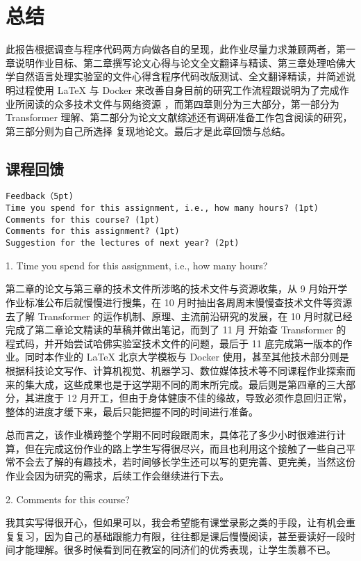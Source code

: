 \chapter{总结}

此报告根据调查与程序代码两方向做各自的呈现，此作业尽量力求兼顾两者，第一章说明作业目标、第二章撰写论文心得与论文全文翻译与精读、第三章处理哈佛大学自然语言处理实验室的文件心得含程序代码改版测试、全文翻译精读，并简述说明过程使用 LaTeX 与 Docker 来改善自身目前的研究工作流程跟说明为了完成作业所阅读的众多技术文件与网络资源 ，而第四章则分为三大部分，第一部分为 Transformer 理解、第二部分为论文文献综述还有调研准备工作包含阅读的研究，第三部分则为自己所选择 复现地论文。最后才是此章回馈与总结。

\section{课程回馈}

\begin{Verbatim}
Feedback（5pt)
Time you spend for this assignment, i.e., how many hours? (1pt)
Comments for this course? (1pt)
Comments for this assignment? (1pt)
Suggestion for the lectures of next year? (2pt)
\end{Verbatim}

1. Time you spend for this assignment, i.e., how many hours?

第二章的论文与第三章的技术文件所涉略的技术文件与资源收集，从 9 月始开学作业标准公布后就慢慢进行搜集，在 10 月时抽出各周周末慢慢查技术文件等资源去了解 Transformer 的运作机制、原理、主流前沿研究的发展，在 10 月时就已经完成了第二章论文精读的草稿并做出笔记，而到了 11 月 开始查 Transformer 的程式码，并开始尝试哈佛实验室技术文件的问题，最后于 11 底完成第一版本的作业。同时本作业的 LaTeX 北京大学模板与 Docker 使用，甚至其他技术部分则是根据科技论文写作、计算机视觉、机器学习、数位媒体技术等不同课程作业探索而来的集大成，这些成果也是于这学期不同的周末所完成。最后则是第四章的三大部分，其进度于 12 月开工，但由于身体健康不佳的缘故，导致必须作息回归正常，整体的进度才缓下来，最后只能把握不同的时间进行准备。

总而言之，该作业横跨整个学期不同时段跟周末，具体花了多少小时很难进行计算，但在完成这份作业的路上学生写得很尽兴，而且也利用这个接触了一些自己平常不会去了解的有趣技术，若时间够长学生还可以写的更完善、更完美，当然这份作业会因为研究的需求，后续工作会继续进行下去。


2. Comments for this course?

我其实写得很开心，但如果可以，我会希望能有课堂录影之类的手段，让有机会重复复习，因为自己的基础跟能力有限，往往都是课后慢慢阅读，甚至要读好一段时间才能理解。很多时候看到同在教室的同济们的优秀表现，让学生羡慕不已。

